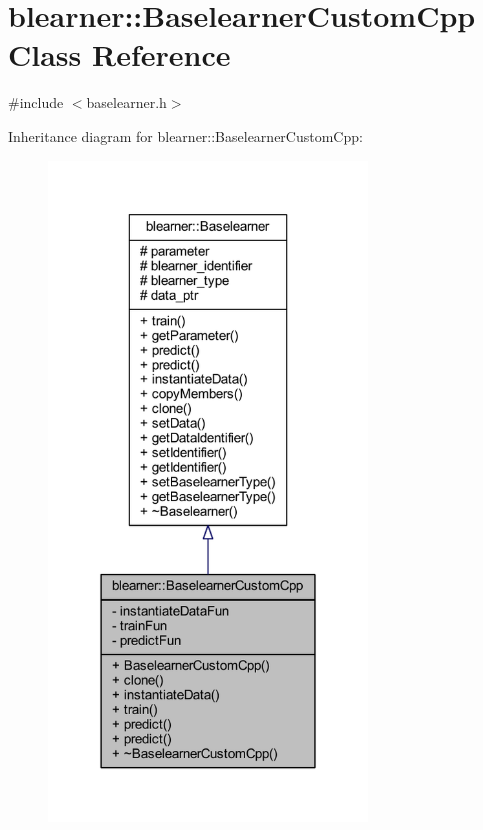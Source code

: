 \hypertarget{classblearner_1_1_baselearner_custom_cpp}{}\section{blearner\+:\+:Baselearner\+Custom\+Cpp Class Reference}
\label{classblearner_1_1_baselearner_custom_cpp}


{\ttfamily \#include $<$baselearner.\+h$>$}



Inheritance diagram for blearner\+:\+:Baselearner\+Custom\+Cpp\+:\nopagebreak
\begin{figure}[H]
\begin{center}
\leavevmode
\includegraphics[width=240pt]{classblearner_1_1_baselearner_custom_cpp__inherit__graph}
\end{center}
\end{figure}


